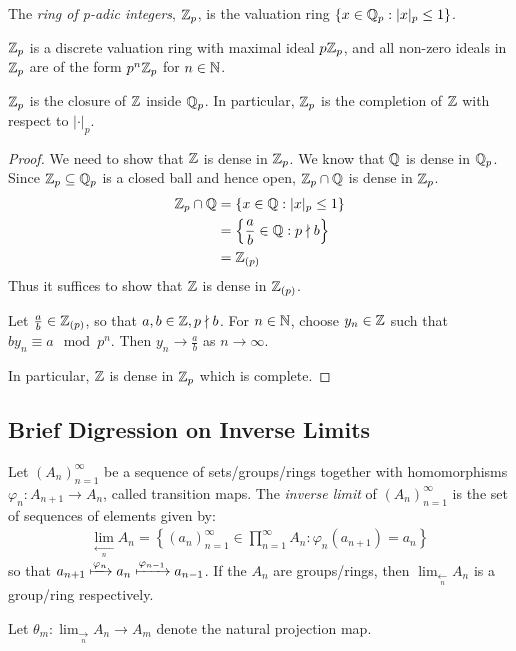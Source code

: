 \documentclass[10pt,a4paper]{article}
\begin{document}
\begin{definition}
  The \emph{ring of p-adic integers}, $\mathbb{Z}_p$, is the valuation ring $\{x \in \mathbb{Q}_p : |x|_p \leq 1\}$.
\end{definition}
$\mathbb{Z}_p$ is a discrete valuation ring with maximal ideal $p\mathbb{Z}_p$, and all non-zero ideals in $\mathbb{Z}_p$ are of the form $p^n \mathbb{Z}_p$ for $n \in \mathbb{N}$.

\begin{proposition}
  $\mathbb{Z}_p$ is the closure of $\mathbb{Z}$ inside $\mathbb{Q}_p$. In particular, $\mathbb{Z}_p$ is the completion of $\mathbb{Z}$ with respect to $|\cdot|_p$.
\end{proposition}
\begin{proof}
  We need to show that $\mathbb{Z}$ is dense in $\mathbb{Z}_p$. We know that $\mathbb{Q}$ is dense in $\mathbb{Q}_p$. Since $\mathbb{Z}_p \subseteq \mathbb{Q}_p$ is a closed ball and hence open, $\mathbb{Z}_p \cap \mathbb{Q}$ is dense in $\mathbb{Z}_p$.
  \begin{align*}
    \mathbb{Z}_p \cap \mathbb{Q} &= \{x \in \mathbb{Q} : |x|_p \leq 1\}\\
    &= \left\{\frac{a}{b} \in \mathbb{Q} : p \nmid b\right\}\\
    &= \mathbb{Z}_{(p)}
  \end{align*}
  Thus it suffices to show that $\mathbb{Z}$ is dense in $\mathbb{Z}_{(p)}$.

  Let $\frac{a}{b} \in \mathbb{Z}_{(p)}$, so that $a, b \in \mathbb{Z}, p\nmid b$. For $n \in \mathbb{N}$, choose $y_n\in\mathbb{Z}$ such that $by_n \equiv a \mod p^n$. Then $y_n \to \frac{a}{b}$ as $n \to \infty$.

  In particular, $\mathbb{Z}$ is dense in $\mathbb{Z}_p$ which is complete.
\end{proof}

\subsection{Brief Digression on Inverse Limits}
Let $(A_n)_{n=1}^\infty$ be a sequence of sets/groups/rings together with homomorphisms $\varphi_n : A_{n+1} \to A_n$, called transition maps. The \emph{inverse limit} of $(A_n)_{n=1}^\infty$ is the set of sequences of elements given by:
\begin{align*}
  \lim_{\xleftarrow[n]{}} A_n = \left\{(a_n)_{n=1}^\infty \in \prod_{n=1}^\infty A_n : \varphi_n(a_{n+1}) = a_n\right\}
\end{align*}
so that $a_{n+1} \xmapsto{\varphi_{n}} a_n \xmapsto{\varphi_{n-1}} a_{n-1}$. If the $A_n$ are groups/rings, then $\lim_{\xleftarrow[n]{}} A_n$ is a group/ring respectively.

Let $\theta_m : \lim_{\xrightarrow[n]{}}A_n \to A_m$ denote the natural projection map.
\end{document}
